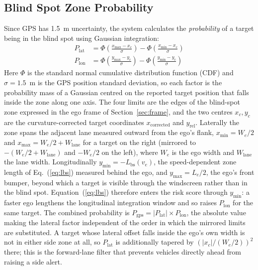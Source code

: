 \documentclass[sn-mathphys-num,Numbered,iicol]{sn-jnl}
\begin{document}
\subsection{Blind Spot Zone Probability}\label{sec:pgps}
Since GPS has 1.5~m uncertainty, the system calculates the \textit{probability} of a target being in the blind spot using Gaussian integration:
\begin{align}
  P_{\mathrm{lat}} &= \Phi\!\left(\frac{x_{\max} - x_c}{\sigma}\right) - \Phi\!\left(\frac{x_{\min} - x_c}{\sigma}\right) \\
  P_{\mathrm{lon}} &= \Phi\!\left(\frac{y_{\max} - y_c}{\sigma}\right) - \Phi\!\left(\frac{y_{\min} - y_c}{\sigma}\right)
\end{align}
Here $\Phi$ is the standard normal cumulative distribution function (CDF) and $\sigma = 1.5$~m is the GPS position standard deviation, so each factor is the probability mass of a Gaussian centred on the reported target position that falls inside the zone along one axis. The four limits are the edges of the blind-spot zone expressed in the ego frame of Section~\ref{sec:frame}, and the two centres $x_c, y_c$ are the curvature-corrected target coordinates $x_{\mathrm{corrected}}$ and $y_{\mathrm{rel}}$. Laterally the zone spans the adjacent lane measured outward from the ego's flank, $x_{\min} = W_e/2$ and $x_{\max} = W_e/2 + W_{\mathrm{lane}}$ for a target on the right (mirrored to $-(W_e/2 + W_{\mathrm{lane}})$ and $-W_e/2$ on the left), where $W_e$ is the ego width and $W_{\mathrm{lane}}$ the lane width. Longitudinally $y_{\min} = -L_{\mathrm{bs}}(v_e)$, the speed-dependent zone length of Eq.~(\ref{eq:lbs}) measured behind the ego, and $y_{\max} = L_e/2$, the ego's front bumper, beyond which a target is visible through the windscreen rather than in the blind spot. Equation~(\ref{eq:lbs}) therefore enters the risk score through $y_{\min}$: a faster ego lengthens the longitudinal integration window and so raises $P_{\mathrm{lon}}$ for the same target. The combined probability is $P_{\mathrm{gps}} = |P_{\mathrm{lat}}| \times P_{\mathrm{lon}}$, the absolute value making the lateral factor independent of the order in which the mirrored limits are substituted. A target whose lateral offset falls inside the ego's own width is not in either side zone at all, so $P_{\mathrm{lat}}$ is additionally tapered by $(|x_c|/(W_e/2))^2$ there; this is the forward-lane filter that prevents vehicles directly ahead from raising a side alert.
\end{document}
